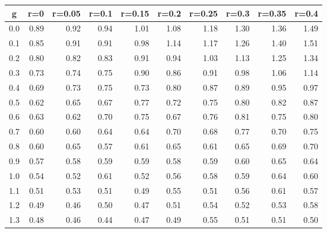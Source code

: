 %
\begin{table}[!tbp]
 \begin{center}
 \begin{tabular}{rrrrrrrrrr}\hline\hline
\multicolumn{1}{c}{g}&\multicolumn{1}{c}{r=0}&\multicolumn{1}{c}{r=0.05}&\multicolumn{1}{c}{r=0.1}&\multicolumn{1}{c}{r=0.15}&\multicolumn{1}{c}{r=0.2}&\multicolumn{1}{c}{r=0.25}&\multicolumn{1}{c}{r=0.3}&\multicolumn{1}{c}{r=0.35}&\multicolumn{1}{c}{r=0.4}\tabularnewline
\hline
0.0&0.89&0.92&0.94&1.01&1.08&1.18&1.30&1.36&1.49\tabularnewline
0.1&0.85&0.91&0.91&0.98&1.14&1.17&1.26&1.40&1.51\tabularnewline
0.2&0.80&0.82&0.83&0.91&0.94&1.03&1.13&1.25&1.34\tabularnewline
0.3&0.73&0.74&0.75&0.90&0.86&0.91&0.98&1.06&1.14\tabularnewline
0.4&0.69&0.73&0.75&0.73&0.80&0.87&0.89&0.95&0.97\tabularnewline
0.5&0.62&0.65&0.67&0.77&0.72&0.75&0.80&0.82&0.87\tabularnewline
0.6&0.63&0.62&0.70&0.75&0.67&0.76&0.81&0.75&0.80\tabularnewline
0.7&0.60&0.60&0.64&0.64&0.70&0.68&0.77&0.70&0.75\tabularnewline
0.8&0.60&0.65&0.57&0.61&0.65&0.61&0.65&0.69&0.70\tabularnewline
0.9&0.57&0.58&0.59&0.59&0.58&0.59&0.60&0.65&0.64\tabularnewline
1.0&0.54&0.52&0.61&0.52&0.56&0.58&0.59&0.64&0.60\tabularnewline
1.1&0.51&0.53&0.51&0.49&0.55&0.51&0.56&0.61&0.57\tabularnewline
1.2&0.49&0.46&0.50&0.47&0.51&0.54&0.52&0.53&0.58\tabularnewline
1.3&0.48&0.46&0.44&0.47&0.49&0.55&0.51&0.51&0.50\tabularnewline
\hline
\end{tabular}

\end{center}

\end{table}

